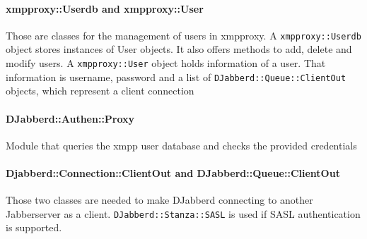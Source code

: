 \documentclass[a4paper,10pt,numbers=noendperiod]{scrartcl}
\begin{document}
	\paragraph{xmpproxy::Userdb and xmpproxy::User} 
	Those are classes for the management of users in xmpproxy. A \texttt{xmpproxy::Userdb} object stores instances of User objects. It also offers methods to add, delete and modify users. A \texttt{xmpproxy::User} object holds information of a user. That information is username, password and a list of \texttt{DJabberd::Queue::ClientOut} objects, which represent a client connection
	\paragraph{DJabberd::Authen::Proxy}
	Module that queries the xmpp user database and checks the provided credentials
	\paragraph{Djabberd::Connection::ClientOut and DJabberd::Queue::ClientOut}
	Those two classes are needed to make DJabberd connecting to another Jabberserver as a client. \texttt{DJabberd::Stanza::SASL} is used if SASL authentication is supported. 

\end{document}
